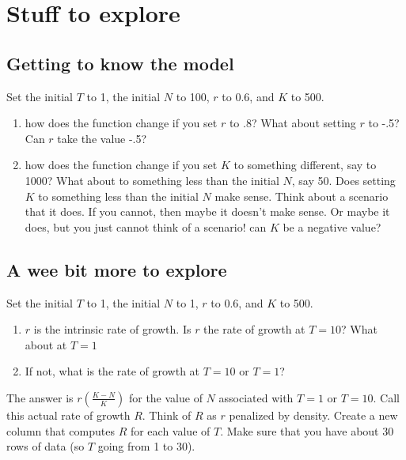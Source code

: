 \documentclass[]{book}
\providecommand{\tightlist}{%
  \setlength{\itemsep}{0pt}\setlength{\parskip}{0pt}}
\begin{document}
\section{Stuff to explore}\label{stuff-to-explore}

\subsection{Getting to know the model}\label{getting-to-know-the-model}

Set the initial \(T\) to 1, the initial \(N\) to 100, \(r\) to 0.6, and
\(K\) to 500.

\begin{enumerate}
\def\labelenumi{\arabic{enumi}.}
\tightlist
\item
  how does the function change if you set \(r\) to .8? What about
  setting \(r\) to -.5? Can \(r\) take the value -.5?
\item
  how does the function change if you set \(K\) to something different,
  say to 1000? What about to something less than the initial \(N\), say
  50. Does setting \(K\) to something less than the initial \(N\) make
  sense. Think about a scenario that it does. If you cannot, then maybe
  it doesn't make sense. Or maybe it does, but you just cannot think of
  a scenario! can \(K\) be a negative value?
\end{enumerate}

\subsection{A wee bit more to explore}\label{a-wee-bit-more-to-explore}

Set the initial \(T\) to 1, the initial \(N\) to 1, \(r\) to 0.6, and
\(K\) to 500.

\begin{enumerate}
\def\labelenumi{\arabic{enumi}.}
\setcounter{enumi}{2}
\tightlist
\item
  \(r\) is the intrinsic rate of growth. Is \(r\) the rate of growth at
  \(T=10\)? What about at \(T=1\)
\item
  If not, what is the rate of growth at \(T=10\) or \(T=1\)?
\end{enumerate}

The answer is \(r(\frac{K-N}{K})\) for the value of \(N\) associated
with \(T=1\) or \(T=10\). Call this actual rate of growth \(R\). Think
of \(R\) as \(r\) penalized by density. Create a new column that
computes \(R\) for each value of \(T\). Make sure that you have about 30
rows of data (so \(T\) going from 1 to 30).
\end{document}
